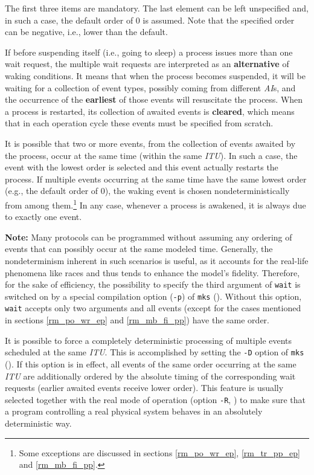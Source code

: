 The first three items are mandatory.
The last element can be left unspecified and, in such a case, the default order
of 0 is assumed.
Note that the specified order can be negative, i.e., lower than the
default.

If before suspending itself (i.e., going to sleep) a process issues more
than one wait request, the multiple wait requests are interpreted as an
{\bf alternative} of waking conditions.
It means that when the process becomes suspended, it will be waiting for
a collection of event types, possibly coming from different {\em AI\/}s,
and the occurrence of the 
{\bf earliest} of those events will resuscitate the process.
When a process is restarted, its collection of awaited events is {\bf cleared},
which means that in each operation cycle these events must be specified
from scratch.

It is possible that
two or more events, from the collection of events awaited by the process,
occur at the same time (within the same {\em ITU\/}).
In such a case, the event with the lowest order
is selected and this event actually restarts the process.
If multiple events occurring at the same time have the same
lowest order (e.g., the default order of 0),
the waking event is chosen nondeterministically from among them.\footnote{Some
exceptions are 
discussed in sections \ref{rm_po_wr_ep}, \ref{rm_tr_pp_ep} and \ref{rm_mb_fi_pp}.}
In any case,
whenever a process is awakened, it is always due to exactly one event.

\medskip

\noindent
{\bf Note:} Many protocols can be programmed without assuming any ordering
of events that can possibly occur at the same modeled time.
Generally, the nondeterminism inherent in such scenarios is useful, as it
accounts for the real-life phenomena like races and thus tends to
enhance the model's fidelity.
Therefore, for the sake of efficiency, the possibility to specify the
third argument of {\tt wait} is switched on by a special compilation option
({\tt -p}) of {\tt mks} ().
Without this option, {\tt wait} accepts only two arguments and all
events (except for the cases mentioned in
sections \ref{rm_po_wr_ep} and \ref{rm_mb_fi_pp}) have the same order.

\medskip

It is possible to force a completely deterministic processing of multiple events
scheduled at the same {\em ITU}.
This is accomplished by setting the {\tt -D} option of {\tt mks}
().
If this option is in effect, all events of the same order occurring at the
same {\em ITU\/}
are additionally ordered by the absolute timing of the corresponding
wait requests (earlier awaited events receive lower order).
This feature is usually selected together with the real mode of operation
(option {\tt -R}, )
to make sure that a program controlling a real physical
system behaves in an absolutely deterministic way.


